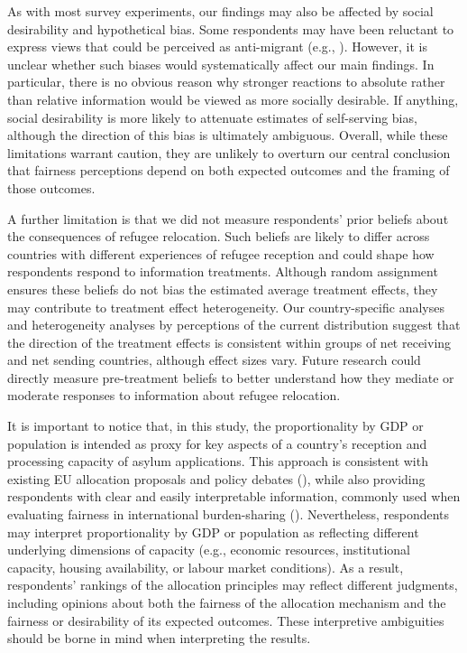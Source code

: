 \documentclass[
  12pt,
  a4paper,
]{article}
\begin{document}
As with most survey experiments, our findings may also be affected by social desirability and hypothetical bias. Some respondents may have been reluctant to express views that could be perceived as anti-migrant (e.g., ). However, it is unclear whether such biases would systematically affect our main findings. In particular, there is no obvious reason why stronger reactions to absolute rather than relative information would be viewed as more socially desirable. If anything, social desirability is more likely to attenuate estimates of self-serving bias, although the direction of this bias is ultimately ambiguous. Overall, while these limitations warrant caution, they are unlikely to overturn our central conclusion that fairness perceptions depend on both expected outcomes and the framing of those outcomes.

A further limitation is that we did not measure respondents' prior beliefs about the consequences of refugee relocation. Such beliefs are likely to differ across countries with different experiences of refugee reception and could shape how respondents respond to information treatments. Although random assignment ensures these beliefs do not bias the estimated average treatment effects, they may contribute to treatment effect heterogeneity. Our country-specific analyses and heterogeneity analyses by perceptions of the current distribution suggest that the direction of the treatment effects is consistent within groups of net receiving and net sending countries, although effect sizes vary. Future research could directly measure pre-treatment beliefs to better understand how they mediate or moderate responses to information about refugee relocation.

It is important to notice that, in this study, the proportionality by GDP or population is intended as proxy for key aspects of a country's reception and processing capacity of asylum applications. This approach is consistent with existing EU allocation proposals and policy debates (), while also providing respondents with clear and easily interpretable information, commonly used when evaluating fairness in international burden-sharing (). Nevertheless, respondents may interpret proportionality by GDP or population as reflecting different underlying dimensions of capacity (e.g., economic resources, institutional capacity, housing availability, or labour market conditions). As a result, respondents' rankings of the allocation principles may reflect different judgments, including opinions about both the fairness of the allocation mechanism and the fairness or desirability of its expected outcomes. These interpretive ambiguities should be borne in mind when interpreting the results.
\end{document}
